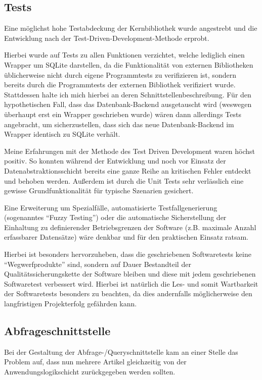 \subsection{Tests}
Eine möglichst hohe Testabdeckung der Kernbibliothek wurde angestrebt und die Entwicklung nach der
Test-Driven-Development-Methode erprobt.

Hierbei wurde auf Tests zu allen Funktionen verzichtet, welche lediglich einen Wrapper um SQLite darstellen, da die
Funktionalität von externen Bibliotheken üblicherweise nicht durch eigene Programmtests zu verifizieren ist, sondern
bereits durch die Programmtests der externen Bibliothek verifiziert wurde. Stattdessen halte ich mich hierbei an deren
Schnittstellenbeschreibung.
Für den hypothetischen Fall, dass das Datenbank-Backend ausgetauscht wird (weswegen überhaupt erst ein Wrapper
geschrieben wurde) wären dann allerdings Tests angebracht, um sicherzustellen, dass sich das neue Datenbank-Backend im
Wrapper identisch zu SQLite verhält.

Meine Erfahrungen mit der Methode des Test Driven Development waren höchst positiv. So konnten während der Entwicklung
und noch vor Einsatz der Datenabstraktionsschicht bereits eine ganze Reihe an kritischen Fehler entdeckt und behoben werden.
Außerdem ist durch die Unit Tests sehr verlässlich eine gewisse Grundfunktionalität für typische Szenarien gesichert.

Eine Erweiterung um Spezialfälle, automatisierte Testfallgenerierung (sogenanntes ``Fuzzy Testing'') oder die automatische
Sicherstellung der Einhaltung zu definierender Betriebsgrenzen der Software (z.B. maximale Anzahl erfassbarer Datensätze)
wäre denkbar und für den praktischen Einsatz ratsam.

Hierbei ist besonders hervorzuheben, dass die geschriebenen Softwaretests keine ``Wegwerfprodukte'' sind, sondern auf
Dauer Bestandteil der Qualitätssicherungskette der Software bleiben und diese mit jedem geschriebenen Softwaretest
verbessert wird. Hierbei ist natürlich die Les- und somit Wartbarkeit der Softwaretests besonders zu beachten, da dies
andernfalls möglicherweise den langfristigen Projekterfolg gefährden kann.

\subsection{Abfrageschnittstelle}
Bei der Gestaltung der Abfrage-/Queryschnittstelle kam an einer Stelle das Problem auf, dass nun mehrere Artikel
gleichzeitig von der Anwendungslogikschicht zurückgegeben werden sollten.

